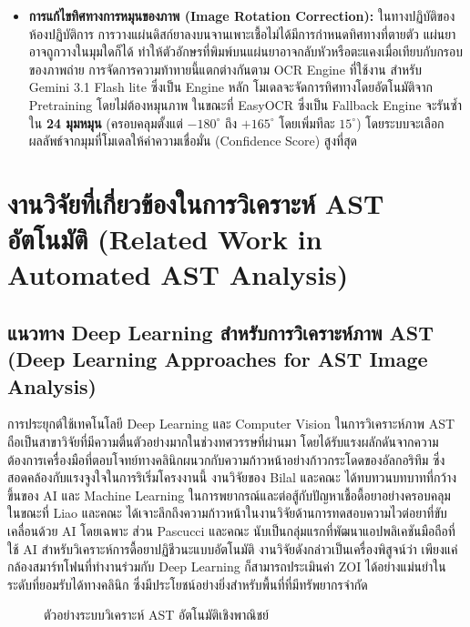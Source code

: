 \begin{itemize}
  \item \textbf{การแก้ไขทิศทางการหมุนของภาพ (Image Rotation Correction):} ในทางปฏิบัติของห้องปฏิบัติการ การวางแผ่นดิสก์ยาลงบนจานเพาะเชื้อไม่ได้มีการกำหนดทิศทางที่ตายตัว แผ่นยาอาจถูกวางในมุมใดก็ได้ ทำให้ตัวอักษรที่พิมพ์บนแผ่นยาอาจกลับหัวหรือตะแคงเมื่อเทียบกับกรอบของภาพถ่าย การจัดการความท้าทายนี้แตกต่างกันตาม OCR Engine ที่ใช้งาน สำหรับ Gemini 3.1 Flash lite ซึ่งเป็น Engine หลัก โมเดลจะจัดการทิศทางโดยอัตโนมัติจาก Pretraining โดยไม่ต้องหมุนภาพ ในขณะที่ EasyOCR ซึ่งเป็น Fallback Engine จะรันซ้ำใน \textbf{24 มุมหมุน} (ครอบคลุมตั้งแต่ $-180^\circ$ ถึง $+165^\circ$ โดยเพิ่มทีละ $15^\circ$) โดยระบบจะเลือกผลลัพธ์จากมุมที่โมเดลให้ค่าความเชื่อมั่น (Confidence Score) สูงที่สุด
\end{itemize}

\section{งานวิจัยที่เกี่ยวข้องในการวิเคราะห์ AST อัตโนมัติ (Related Work in Automated AST Analysis)}

\subsection{แนวทาง Deep Learning สำหรับการวิเคราะห์ภาพ AST (Deep Learning Approaches for AST Image Analysis)}

การประยุกต์ใช้เทคโนโลยี Deep Learning และ Computer Vision ในการวิเคราะห์ภาพ AST ถือเป็นสาขาวิจัยที่มีความตื่นตัวอย่างมากในช่วงทศวรรษที่ผ่านมา โดยได้รับแรงผลักดันจากความต้องการเครื่องมือที่ตอบโจทย์ทางคลินิกผนวกกับความก้าวหน้าอย่างก้าวกระโดดของอัลกอริทึม ซึ่งสอดคล้องกับแรงจูงใจในการริเริ่มโครงงานนี้ งานวิจัยของ Bilal และคณะ \cite{bilal2025} ได้ทบทวนบทบาทที่กว้างขึ้นของ AI และ Machine Learning ในการพยากรณ์และต่อสู้กับปัญหาเชื้อดื้อยาอย่างครอบคลุม ในขณะที่ Liao และคณะ \cite{liao2025} ได้เจาะลึกถึงความก้าวหน้าในงานวิจัยด้านการทดสอบความไวต่อยาที่ขับเคลื่อนด้วย AI โดยเฉพาะ
ส่วน Pascucci และคณะ \cite{pascucci2021,pascucci2020preprint} นับเป็นกลุ่มแรกที่พัฒนาแอปพลิเคชันมือถือที่ใช้ AI สำหรับวิเคราะห์การดื้อยาปฏิชีวนะแบบอัตโนมัติ งานวิจัยดังกล่าวเป็นเครื่องพิสูจน์ว่า เพียงแค่กล้องสมาร์ทโฟนที่ทำงานร่วมกับ Deep Learning ก็สามารถประเมินค่า ZOI ได้อย่างแม่นยำในระดับที่ยอมรับได้ทางคลินิก ซึ่งมีประโยชน์อย่างยิ่งสำหรับพื้นที่ที่มีทรัพยากรจำกัด

\begin{figure}[H]
  \centering
  \caption{ตัวอย่างระบบวิเคราะห์ AST อัตโนมัติเชิงพาณิชย์ \cite{rajasekar2023}}
  \label{fig:related_existing}
\end{figure}

